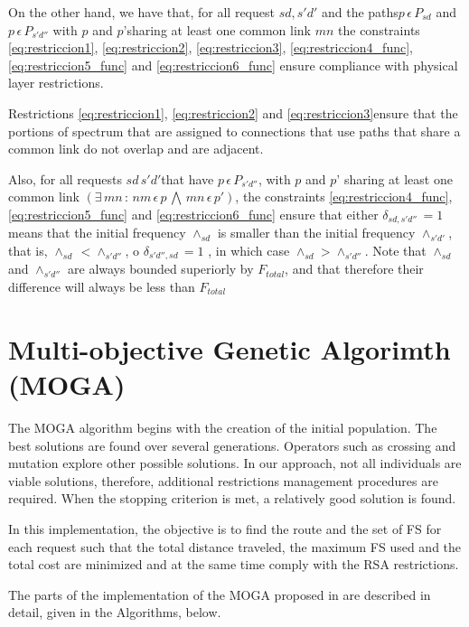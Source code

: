 On the other hand, we have that, for all request $sd,s'd'$ and the
paths$p\,\epsilon\,P_{sd}$ and $p\,\epsilon\,P_{s'd''}$ with $p$
and $p\text{'}$sharing at least one common link $mn$ the constraints
\ref{eq:restriccion1}, \ref{eq:restriccion2}, \ref{eq:restriccion3},
\ref{eq:restriccion4_func}, \ref{eq:restriccion5_func} and \ref{eq:restriccion6_func}
ensure compliance with physical layer restrictions. 

Restrictions \ref{eq:restriccion1}, \ref{eq:restriccion2} and \ref{eq:restriccion3}ensure
that the portions of spectrum that are assigned to connections that
use paths that share a common link do not overlap and are adjacent. 

Also, for all requests $sd\,s'd'$that have $p\,\epsilon\,P_{s'd''}$,
with $p$ and $p\text{'}$ sharing at least one common link $\left(\exists\,mn\,\colon\,nm\,\epsilon\,p\,\bigwedge\,mn\,\epsilon\,p'\right)$,
the constraints \ref{eq:restriccion4_func}, \ref{eq:restriccion5_func}
and \ref{eq:restriccion6_func} ensure that either $\delta_{sd,s'd''}\,=1$
means that the initial frequency $\land_{sd}$ is smaller than the
initial frequency $\land_{s'd'}$, that is, $\land_{sd}\,<\land_{s'd''}$,
o $\delta_{s'd'',sd}\,=1$ , in which case $\land_{sd}>\land_{s'd''}$.
Note that $\land_{sd}$ and $\land_{s'd''}$ are always bounded superiorly
by $F_{total}$, and that therefore their difference will always be
less than $F_{total}$ 

\section{Multi-objective Genetic Algorimth (MOGA)}

The MOGA algorithm begins with the creation of the initial population.
The best solutions are found over several generations. Operators such
as crossing and mutation explore other possible solutions. In our
approach, not all individuals are viable solutions, therefore, additional
restrictions management procedures are required. When the stopping
criterion is met, a relatively good solution is found.

In this implementation, the objective is to find the route and the
set of FS for each request such that the total distance traveled,
the maximum FS used and the total cost are minimized and at the same
time comply with the RSA restrictions.

The parts of the implementation of the MOGA proposed in \cite{engopt}
are described in detail, given in the Algorithms, below.

